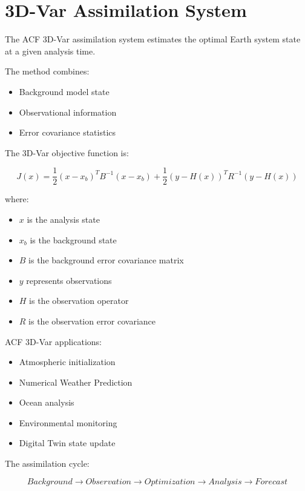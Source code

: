 \section{3D-Var Assimilation System}



The ACF 3D-Var assimilation system estimates the optimal
Earth system state at a given analysis time.



The method combines:


\begin{itemize}

\item Background model state

\item Observational information

\item Error covariance statistics

\end{itemize}



The 3D-Var objective function is:


\[
J(x)=
\frac{1}{2}(x-x_b)^TB^{-1}(x-x_b)
+
\frac{1}{2}(y-H(x))^TR^{-1}(y-H(x))
\]



where:


\begin{itemize}

\item $x$ is the analysis state

\item $x_b$ is the background state

\item $B$ is the background error covariance matrix

\item $y$ represents observations

\item $H$ is the observation operator

\item $R$ is the observation error covariance

\end{itemize}



ACF 3D-Var applications:


\begin{itemize}

\item Atmospheric initialization

\item Numerical Weather Prediction

\item Ocean analysis

\item Environmental monitoring

\item Digital Twin state update

\end{itemize}



The assimilation cycle:


\[
Background
\rightarrow
Observation
\rightarrow
Optimization
\rightarrow
Analysis
\rightarrow
Forecast
\]
